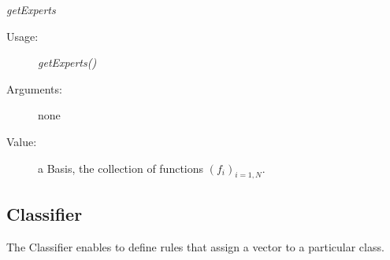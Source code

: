 \begin{description}
\begin{description}
\item \textit{getExperts}
\begin{description}
\item[Usage:] \textit{getExperts()}
\item[Arguments:] none
\item[Value:] a Basis, the collection of functions $(f_i)_{i=1, N}$.
\end{description}

\end{description}
\end{description}


\newpage
\subsection{Classifier}

The Classifier enables to define rules that assign a vector to a particular class.


